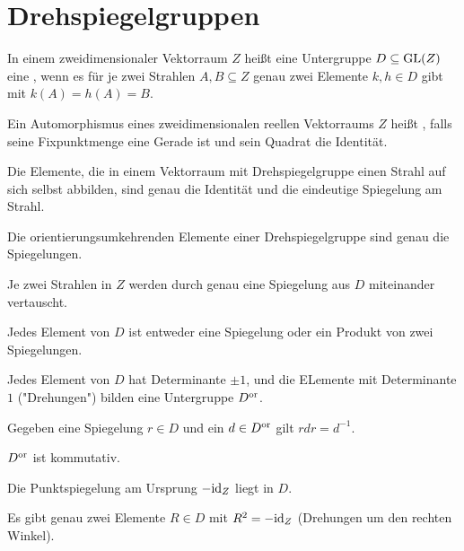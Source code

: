 \documentclass{article}
\begin{document}
	\section*{Drehspiegelgruppen}
	\begin{definition}
		In einem zweidimensionaler Vektorraum $Z$ heißt eine Untergruppe $D \subseteq \textnormal{GL}(Z)$ eine , wenn es für je zwei Strahlen $A,B \subseteq Z$ genau zwei Elemente $k,h \in D$ gibt mit $k(A) = h(A) = B$.
	\end{definition}
	\begin{definition}
		Ein Automorphismus eines zweidimensionalen reellen Vektorraums $Z$ heißt , falls seine Fixpunktmenge eine Gerade ist und sein Quadrat die Identität.
	\end{definition}
	\begin{lemma}
		Die Elemente, die in einem Vektorraum mit Drehspiegelgruppe einen Strahl auf sich selbst abbilden, sind genau die Identität und die eindeutige Spiegelung am Strahl.
	\end{lemma}
	\begin{lemma}
		Die orientierungsumkehrenden Elemente einer Drehspiegelgruppe sind genau die Spiegelungen.
	\end{lemma}
	\begin{lemma}
		Je zwei Strahlen in $Z$ werden durch genau eine Spiegelung aus $D$ miteinander vertauscht.
	\end{lemma}
	\begin{lemma}
		Jedes Element von $D$ ist entweder eine Spiegelung oder ein Produkt von zwei Spiegelungen.
	\end{lemma}
	\begin{lemma}
		Jedes Element von $D$ hat Determinante $\pm 1$, und die ELemente mit Determinante $1$ ("Drehungen") bilden eine Untergruppe $D^{\textnormal{or}}$.
	\end{lemma}
	\begin{lemma}
		Gegeben eine Spiegelung $r \in D$ und ein $d \in D^{\textnormal{or}}$ gilt $rdr = d^{-1}$.
	\end{lemma}
	\begin{lemma}
		$D^{\textnormal{or}}$ ist kommutativ.
	\end{lemma}
	\begin{lemma}
		Die Punktspiegelung am Ursprung $-\textnormal{id}_Z$ liegt in $D$.
	\end{lemma}
	\begin{lemma}
		Es gibt genau zwei Elemente $R \in D$ mit $R^2 = -\textnormal{id}_Z$ (Drehungen um den rechten Winkel).
	\end{lemma}
\end{document}

